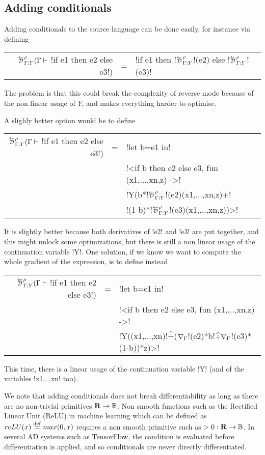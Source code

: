 \subsection{Adding conditionals} %
\label{sub:Adding conditionals}

Adding conditionals to the source language can be done easily, for instance via defining

\begin{tabular}{r c l}
$\directD{\rho}{\Gamma}{Y}(\Gamma \vdash$ !if e1 then e2 else e3!) &=& !if e1 then !$\directD{\rho}{\Gamma}{Y}$!(e2) else !$\directD{\rho}{\Gamma}{Y}$!(e3)! 
\end{tabular}

The problem is that this could break the complexity of reverse mode because of the non linear usage of $Y$, and makes everything harder to optimise.

A slighly better option would be to define 

\begin{tabular}{r c l}
    $\directD{\rho}{\Gamma}{Y}(\Gamma \vdash$ !if e1 then e2 else e3!) 
    &=& !let b=e1 in!   \\
    && !<if b then e2 else e3, fun (x1,...,xn,z) ->! \\
    && !Y(b*!$\directD{\rho}{\Gamma}{Y}$!(e2)(x1,...,xn,z)+!\\
    && \quad!(1-b)*!$\directD{\rho}{\Gamma}{Y}$!(e3)(x1,...,xn,z))>!
\end{tabular}

It is slightly better because both derivatives of !e2! and !e3! are put together, and this might unlock some optimizations, 
but there is still a non linear usage of the continuation variable !Y!.
One solution, if we know we want to compute the whole gradient of the expression, is to define instead

\begin{tabular}{r c l}
    $\directD{\rho}{\Gamma}{Y}(\Gamma \vdash$ !if e1 then e2 else e3!) 
    &=& !let b=e1 in!   \\
    && !<if b then e2 else e3, fun (x1,...,xn,z) ->! \\
    && !Y((x1,...,xn)!$\widehat{+}$($\nabla_\Gamma$!(e2)*b!$\widehat{+}\nabla_\Gamma$!(e3)*(1-b))*z)>!\\
\end{tabular}

This time, there is a linear usage of the continuation variable !Y! (and of the variables !x1,...xn! too).

We note that adding conditionals does not break differentiability as long as there are no non-trivial primitives $\mathbf{R}\to\mathbb{B}$.
Non smooth functions such as the Rectified Linear Unit (ReLU) in machine learning which can be defined as $reLU(x)\stackrel {\mathrm{def}}= max(0,x)$ 
requires a non smooth primitive such as $>0: \mathbf{R}\to\mathbb{B}$. In several AD systems such as TensorFlow, 
the condition is evaluated before differentiation is applied, and so conditionals are never directly differentiated.

